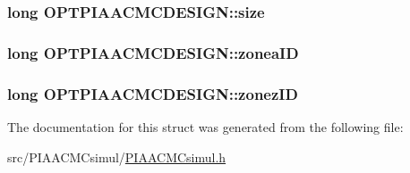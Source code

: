 \hypertarget{structOPTPIAACMCDESIGN_a9a77cc42ff9de1dbd1d484e7020da6eb}{
\subsubsection[{size}]{\setlength{\rightskip}{0pt plus 5cm}long O\+P\+T\+P\+I\+A\+A\+C\+M\+C\+D\+E\+S\+I\+G\+N\+::size}}\label{structOPTPIAACMCDESIGN_a9a77cc42ff9de1dbd1d484e7020da6eb}
\hypertarget{structOPTPIAACMCDESIGN_afdfb76344ee9a82f3a5790fcb602ade6}{
\subsubsection[{zonea\+I\+D}]{\setlength{\rightskip}{0pt plus 5cm}long O\+P\+T\+P\+I\+A\+A\+C\+M\+C\+D\+E\+S\+I\+G\+N\+::zonea\+I\+D}}\label{structOPTPIAACMCDESIGN_afdfb76344ee9a82f3a5790fcb602ade6}
\hypertarget{structOPTPIAACMCDESIGN_a46c2ef78ec06d39b947a793d0a03dc28}{
\subsubsection[{zonez\+I\+D}]{\setlength{\rightskip}{0pt plus 5cm}long O\+P\+T\+P\+I\+A\+A\+C\+M\+C\+D\+E\+S\+I\+G\+N\+::zonez\+I\+D}}\label{structOPTPIAACMCDESIGN_a46c2ef78ec06d39b947a793d0a03dc28}


The documentation for this struct was generated from the following file\+:\begin{DoxyCompactItemize}
\item 
src/\+P\+I\+A\+A\+C\+M\+Csimul/\hyperlink{PIAACMCsimul_8h}{P\+I\+A\+A\+C\+M\+Csimul.\+h}\end{DoxyCompactItemize}
